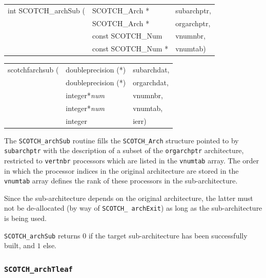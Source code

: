 \begin{itemize}
\progsyn

{\tt\begin{tabular}{l@{}ll}
int SCOTCH\_archSub ( & SCOTCH\_Arch *      & subarchptr, \\
                      & SCOTCH\_Arch *      & orgarchptr, \\
                      & const SCOTCH\_Num   & vnumnbr,    \\
                      & const SCOTCH\_Num * & vnumtab)    \\
\end{tabular}}

{\tt\begin{tabular}{l@{}ll}
scotchfarchsub ( & doubleprecision (*) & subarchdat, \\
                 & doubleprecision (*) & orgarchdat, \\
                 & integer*{\it num}   & vnumnbr,    \\
                 & integer*{\it num}   & vnumtab,    \\
                 & integer             & ierr)
\end{tabular}}

\progdes

The \texttt{SCOTCH\_archSub} routine fills the
\texttt{SCOTCH\_\lbt Arch} structure pointed to by \texttt{subarchptr}
with the description of a subset of the \texttt{orgarchptr}
architecture, restricted to \texttt{vertnbr} processors which are
listed in the \texttt{vnumtab} array. The order in which the
processor indices in the original architecture are stored in the
\texttt{vnumtab} array defines the rank of these processors in the
sub-architecture.

Since the sub-architecture depends on the original architecture, the
latter must not be de-allocated (by way of \texttt{SCOTCH\_\lbt
arch\lbt Exit}) as long as the sub-architecture is being used.

\progret

{\tt SCOTCH\_archSub} returns $0$ if the target sub-architecture
has been successfully built, and $1$ else.
\end{itemize}

\subsubsection{{\tt SCOTCH\_archTleaf}}

